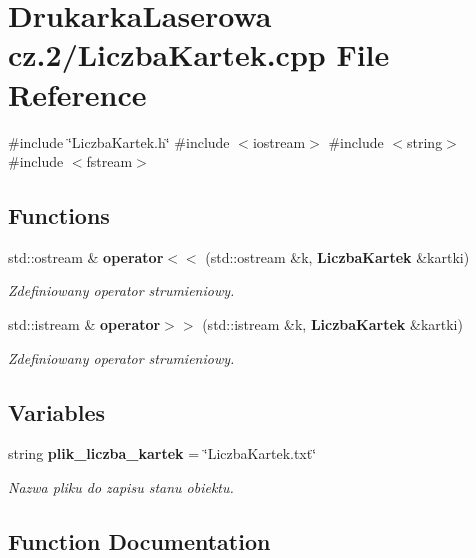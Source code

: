 \section{Drukarka\+Laserowa cz.2/\+Liczba\+Kartek.cpp File Reference}
\label{_liczba_kartek_8cpp}
{\ttfamily \#include \char`\"{}Liczba\+Kartek.\+h\char`\"{}}\newline
{\ttfamily \#include $<$iostream$>$}\newline
{\ttfamily \#include $<$string$>$}\newline
{\ttfamily \#include $<$fstream$>$}\newline
\subsection*{Functions}
\begin{DoxyCompactItemize}
\item 
std\+::ostream \& \textbf{ operator$<$$<$} (std\+::ostream \&k, \textbf{ Liczba\+Kartek} \&kartki)
\begin{DoxyCompactList}\small\item\em Zdefiniowany operator strumieniowy. \end{DoxyCompactList}\item 
std\+::istream \& \textbf{ operator$>$$>$} (std\+::istream \&k, \textbf{ Liczba\+Kartek} \&kartki)
\begin{DoxyCompactList}\small\item\em Zdefiniowany operator strumieniowy. \end{DoxyCompactList}\end{DoxyCompactItemize}
\subsection*{Variables}
\begin{DoxyCompactItemize}
\item 
string \textbf{ plik\+\_\+liczba\+\_\+kartek} = \char`\"{}Liczba\+Kartek.\+txt\char`\"{}
\begin{DoxyCompactList}\small\item\em Nazwa pliku do zapisu stanu obiektu. \end{DoxyCompactList}\end{DoxyCompactItemize}


\subsection{Function Documentation}
\mbox{\label{_liczba_kartek_8cpp_a5d2f18a424b2dac713091623bd021ae0}} 
